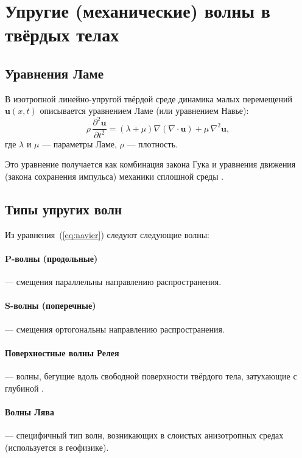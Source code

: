 \section{Упругие (механические) волны в твёрдых телах}

\subsection{Уравнения Ламе}

В изотропной линейно-упругой твёрдой среде динамика малых перемещений
$\mathbf{u}(x,t)$ описывается уравнением Ламе (или уравнением Навье):
\begin{equation}
\rho\,\frac{\partial^2 \mathbf{u}}{\partial t^2}
=
(\lambda + \mu)\nabla(\nabla\cdot\mathbf{u})
+
\mu\,\nabla^2\mathbf{u},
\label{eq:navier}
\end{equation}
где $\lambda$ и $\mu$ — параметры Ламе, $\rho$ — плотность.  

Это уравнение получается как комбинация закона Гука и уравнения движения
(закона сохранения импульса) механики сплошной среды \cite{MIT_continuum, Berkeley_ME185}.

\subsection{Типы упругих волн}

Из уравнения~(\ref{eq:navier}) следуют следующие волны:

\paragraph{P-волны (продольные)} — смещения параллельны направлению распространения.  
\paragraph{S-волны (поперечные)} — смещения ортогональны направлению распространения.  
\paragraph{Поверхностные волны Релея} — волны, бегущие вдоль свободной поверхности твёрдого тела, затухающие с глубиной \cite{Achenbach, Graff}.  
\paragraph{Волны Лява} — специфичный тип волн, возникающих в слоистых анизотропных средах (используется в геофизике).  

